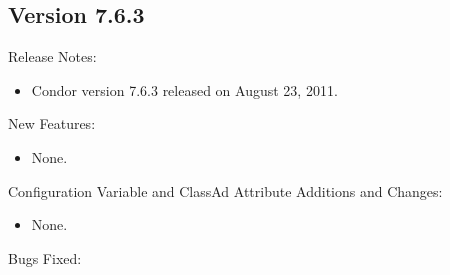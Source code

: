 \subsection*{\label{sec:New-7-6-3}Version 7.6.3}

\noindent Release Notes:

\begin{itemize}

\item Condor version 7.6.3 released on August 23, 2011.

\end{itemize}


\noindent New Features:

\begin{itemize}

\item None.

\end{itemize}

\noindent Configuration Variable and ClassAd Attribute Additions and Changes:

\begin{itemize}

\item None.

\end{itemize}

\noindent Bugs Fixed:

